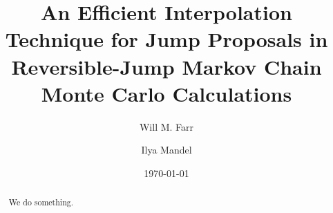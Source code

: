 \documentclass[prd,preprint]{revtex4}
\begin{document}
\title{An Efficient Interpolation Technique for Jump Proposals in
  Reversible-Jump Markov Chain Monte Carlo Calculations}

\date{\today}

\author{Will M. Farr}

\author{Ilya Mandel}


\begin{abstract}
  We do something.
\end{abstract}

\maketitle
\end{document}
